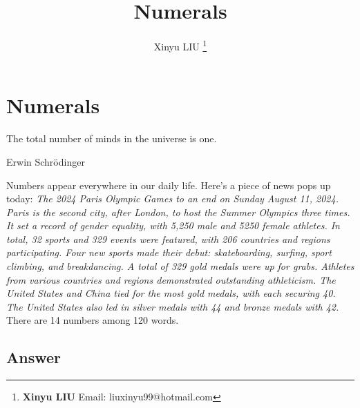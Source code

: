 \documentclass[b5paper]{article}
\begin{document}
\title{Numerals}

\author{Xinyu LIU
\thanks{{\bfseries Xinyu LIU} \newline
  Email: liuxinyu99@hotmail.com \newline}
  }

\maketitle
\fi


\ifx\wholebook\relax
\chapter{Numerals}
\fi

\epigraph{The total number of minds in the universe is one.}{Erwin Schrödinger}

Numbers appear everywhere in our daily life. Here's a piece of news pops up today: \textit{The 2024 Paris Olympic Games to an end on Sunday August 11, 2024. Paris is the second city, after London, to host the Summer Olympics three times. It set a record of gender equality, with 5,250 male and 5250 female athletes. In total, 32 sports and 329 events were featured, with 206 countries and regions participating. Four new sports made their debut: skateboarding, surfing, sport climbing, and breakdancing. A total of 329 gold medals were up for grabs. Athletes from various countries and regions demonstrated outstanding athleticism. The United States and China tied for the most gold medals, with each securing 40. The United States also led in silver medals with 44 and bronze medals with 42.} There are 14 numbers among 120 words.

\ifx\wholebook\relax \else
\section{Answer}
\shipoutAnswer

\begin{thebibliography}{99}




\end{thebibliography}

\expandafter\enddocument

\fi
\end{document}
